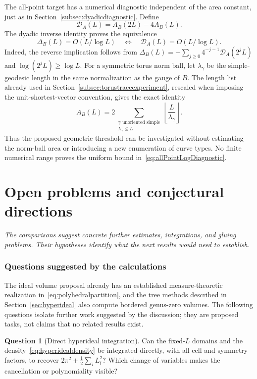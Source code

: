 \documentclass[11pt,a4paper]{article}
\newcommand{\monographpart}[2]{%
  \clearpage\part{#1}%
  \noindent\textit{#2}\par\medskip}
\numberwithin{equation}{section}
\theoremstyle{definition}
\newtheorem{question}[theorem]{Question}
\theoremstyle{remark}
\begin{document}
The all-point target has a numerical diagnostic independent of the area
constant, just as in Section~\ref{subsec:dyadicdiagnostic}. Define
\[
 \mathcal D_A(L)=A_B(2L)-4A_B(L).
\]
The dyadic inverse identity proves the equivalence
\begin{equation}
 \Delta_B(L)=O(L/\log L)
 \quad\Longleftrightarrow\quad
 \mathcal D_A(L)=O(L/\log L).
 \label{eq:allPointLogDiagnostic}
\end{equation}
Indeed, the reverse implication follows from
$\Delta_B(L)=-\sum_{j\ge0}4^{-j-1}\mathcal D_A(2^jL)$
and $\log(2^jL)\ge\log L$. For a symmetric torus norm ball,
let $\lambda_\gamma$ be the simple-geodesic length in the same
normalization as the gauge of $B$. The length list already used in
Section~\ref{subsec:torustraceexperiment}, rescaled when imposing the
unit-shortest-vector convention, gives the exact identity
\[
 A_B(L)=2\sum_{\substack{\gamma\text{ unoriented simple}\\\lambda_\gamma\le L}}
               \left\lfloor\frac L{\lambda_\gamma}\right\rfloor.
\]
Thus the proposed geometric threshold can be investigated without
estimating the norm-ball area or introducing a new enumeration of
curve types. No finite numerical range proves the uniform bound
in~\eqref{eq:allPointLogDiagnostic}.




\monographpart{Open problems and conjectural directions}{The comparisons suggest concrete further estimates, integrations, and gluing problems. Their hypotheses identify what the next results would need to establish.}

\section{Questions suggested by the calculations}
\label{sec:questions}

The ideal volume proposal already has an established measure-theoretic
realization in~\eqref{eq:polyhedralpartition}, and the tree methods described
in Section~\ref{sec:hyperideal} also compute bordered genus-zero volumes.
The following questions isolate further work suggested by the discussion;
they are proposed tasks, not claims that no related results exist.

\begin{question}[Direct hyperideal integration]
Can the fixed-$L$ domains and the density~\eqref{eq:hyperidealdensity} be
integrated directly, with all cell and symmetry factors, to recover
$2\pi^2+\frac12\sum_iL_i^2$? Which change of variables makes the
cancellation or polynomiality visible?
\end{question}
\end{document}
